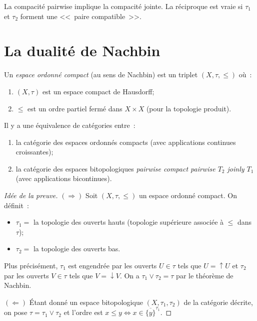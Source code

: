 \begin{proposition}
La compacit\'e pairwise implique la compacit\'e jointe. La r\'eciproque est vraie si
$\tau_1$ et $\tau_2$ forment une <<~paire compatible~>>.
\end{proposition}

\section{La dualit\'e de Nachbin}

\begin{definition}
Un \emph{espace ordonn\'e compact} (au sens de Nachbin) est un triplet $(X, \tau, \leq)$
o\`u~:
\begin{enumerate}
  \item $(X,\tau)$ est un espace compact de Hausdorff;
  \item $\leq$ est un ordre partiel ferm\'e dans $X \times X$ (pour la topologie produit).
\end{enumerate}
\end{definition}

\begin{theoreme}
Il y a une \'equivalence de cat\'egories entre~:
\begin{enumerate}
  \item la cat\'egorie des espaces ordonn\'es compacts (avec applications continues
    croissantes);
  \item la cat\'egorie des espaces bitopologiques \emph{pairwise compact pairwise $T_2$
    joinly $T_1$} (avec applications bicontinues).
\end{enumerate}
\end{theoreme}

\begin{proof}[Id\'ee de la preuve]
\noindent$(\Rightarrow)$ Soit $(X,\tau,\leq)$ un espace ordonn\'e compact. On d\'efinit~:
\begin{itemize}
  \item $\tau_1 = $ la topologie des ouverts hauts (topologie sup\'erieure associ\'ee
    \`a $\leq$ dans $\tau$);
  \item $\tau_2 = $ la topologie des ouverts bas.
\end{itemize}
Plus pr\'ecis\'ement, $\tau_1$ est engendr\'ee par les ouverts $U \in \tau$ tels que
$U = \uparrow U$ et $\tau_2$ par les ouverts $V \in \tau$ tels que $V = \downarrow V$.
On a $\tau_1 \vee \tau_2 = \tau$ par le th\'eor\`eme de Nachbin.

$(\Leftarrow)$ \'Etant donn\'e un espace bitopologique $(X,\tau_1,\tau_2)$ de la
cat\'egorie d\'ecrite, on pose $\tau = \tau_1 \vee \tau_2$ et l'ordre est
$x \leq y \Leftrightarrow x \in \overline{\{y\}}^{\tau_1}$.
\end{proof}

